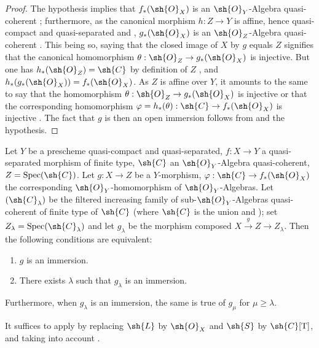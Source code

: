\begin{proof}
The hypothesis implies that $f_*(\sh{O}_X)$ is an $\sh{O}_Y$-Algebra quasi-coherent ; furthermore, as the canonical morphism $h:Z\to Y$ is affine, hence quasi-compact and quasi-separated  and , $g_*(\sh{O}_X)$ is an $\sh{O}_Z$-Algebra quasi-coherent .
This being so, saying that the closed image of $X$ by $g$ equals $Z$ signifies  that the canonical homomorphism $\theta:\sh{O}_Z\to g_*(\sh{O}_X)$ is injective.
But one has $h_*(\sh{O}_Z)=\sh{C}$ by definition of $Z$ , and $h_*(g_*(\sh{O}_X))=f_*(\sh{O}_X)$.
As $Z$ is affine over $Y$, it amounts to the same to say that the homomorphism $\theta:\sh{O}_Z\to g_*(\sh{O}_X)$ is injective or that the corresponding homomorphism $\varphi=h_*(\theta):\sh{C}\to f_*(\sh{O}_X)$ is injective .
The fact that $g$ is then an open immersion follows from  and the hypothesis.
\end{proof}

\begin{lemma}[8.12.2]
\label{IV.8.12.2}
Let $Y$ be a prescheme quasi-compact and quasi-separated, $f:X\to Y$ a quasi-separated morphism of finite type, $\sh{C}$ an $\sh{O}_Y$-Algebra quasi-coherent, $Z=\operatorname{Spec}(\sh{C})$.
Let $g:X\to Z$ be a $Y$-morphism, $\varphi:\sh{C}\to f_*(\sh{O}_X)$ the corresponding $\sh{O}_Y$-homomorphism of $\sh{O}_Y$-Algebras.
Let $(\sh{C}_\lambda)$ be the filtered increasing family of sub-$\sh{O}_Y$-Algebras quasi-coherent of finite type of $\sh{C}$ (where $\sh{C}$ is the union  and ); set $Z_\lambda=\operatorname{Spec}(\sh{C}_\lambda)$ and let $g_\lambda$ be the morphism composed $X\xrightarrow{g}Z\to Z_\lambda$.
Then the following conditions are equivalent:
\begin{enumerate}[label=\emph{\alph*)}]
  \item $g$ is an immersion.
  \item There exists $\lambda$ such that $g_\lambda$ is an immersion.
\end{enumerate}
Furthermore, when $g_\lambda$ is an immersion, the same is true of $g_\mu$ for $\mu\geqslant\lambda$.

It suffices to apply  by replacing $\sh{L}$ by $\sh{O}_X$ and $\sh{S}$ by $\sh{C}[\mathrm{T}]$, and taking into account .
\end{lemma}

